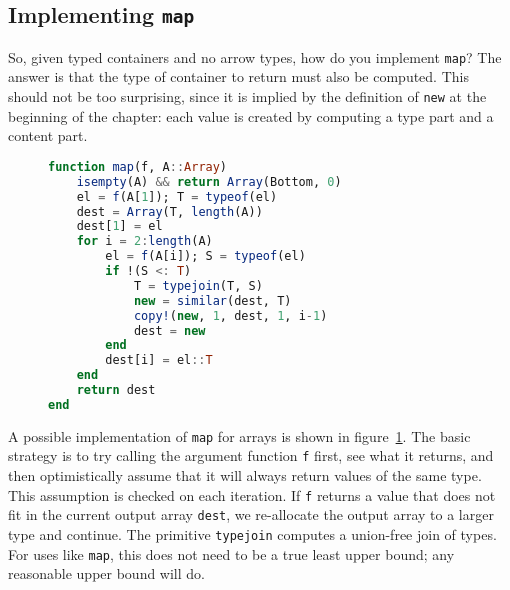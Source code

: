 \subsection{Implementing \texttt{map}}

So, given typed containers and no arrow types, how do you implement
\texttt{map}? The answer is that the type of container to return must
also be computed. This should not be too surprising, since it is implied by
the definition of \texttt{new} at the beginning of the chapter: each
value is created by computing a type part and a content part.

\begin{singlespace}
\begin{figure}
\begin{lstlisting}[language=julia]
function map(f, A::Array)
    isempty(A) && return Array(Bottom, 0)
    el = f(A[1]); T = typeof(el)
    dest = Array(T, length(A))
    dest[1] = el
    for i = 2:length(A)
        el = f(A[i]); S = typeof(el)
        if !(S <: T)
            T = typejoin(T, S)
            new = similar(dest, T)
            copy!(new, 1, dest, 1, i-1)
            dest = new
        end
        dest[i] = el::T
    end
    return dest
end
\end{lstlisting}
  \caption{
  }
  \label{fig:mapimpl}
\end{figure}
\end{singlespace}

A possible implementation of \texttt{map} for arrays is shown in
figure~\ref{fig:mapimpl}.
The basic strategy is to try calling the argument function \texttt{f}
first, see what it returns, and then optimistically assume that it
will always return values of the same type.
This assumption is checked on each iteration.
If \texttt{f} returns a value that does not fit in the current output
array \texttt{dest}, we re-allocate the output array to a larger
type and continue.
The primitive \texttt{typejoin} computes a union-free join of types.
For uses like \texttt{map}, this does not need to be a true least
upper bound; any reasonable upper bound will do.

